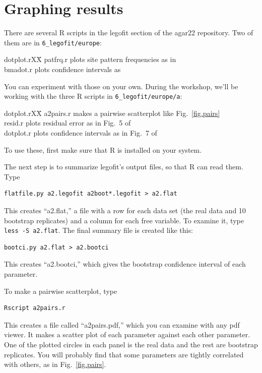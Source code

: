 \documentclass[11pt]{article}
\newenvironment{leftindent}%
{\begin{list}{}%
         {\setlength{\leftmargin}{2em}}%
         \item[]%
}{\end{list}}
\begin{document}
\section{Graphing results}
\label{sec.graph}
There are several R scripts in the legofit section of the agar22
repository. Two of them are in \verb|6_legofit/europe|:
\begin{leftindent}
\begin{tabbing}
  dotplot.rXX\=\kill
patfrq.r \> plots site pattern frequencies as in
    \citet[Fig.~3]{Rogers:arXiv-2201.02668}\\ 
bmadot.r \> plots confidence intervals as 
  \citet[Fig.~7]{Rogers:PCJ-2-e32}
\end{tabbing}
\end{leftindent}
You can experiment with those on your own. During the workshop, we'll
be working with the three R scripts in \verb|6_legofit/europe/a|:
\begin{leftindent}
\begin{tabbing}
  dotplot.rXX\=\kill
a2pairs.r \> makes a pairwise scatterplot like
  Fig.~\ref{fig.pairs}\\
resid.r \> plots residual error as in Fig.~5 of \citep{Rogers:PCJ-2-e32}\\
dotplot.r \> plots confidence intervals as in Fig.~7 of
  \citep{Rogers:PCJ-2-e32}
\end{tabbing}
\end{leftindent}
To use these, first make sure that R is installed on your system.

The next step is to summarize legofit's output files, so that R can
read them. Type
\begin{verbatim}
flatfile.py a2.legofit a2boot*.legofit > a2.flat
\end{verbatim}
This creates ``a2.flat,'' a file with a row for each data set (the
real data and 10 bootstrap replicates) and a column for each free
variable. To examine it, type \texttt{less -S a2.flat}. The final
summary file is created like this:
\begin{verbatim}
bootci.py a2.flat > a2.bootci
\end{verbatim}
This creates ``a2.bootci,'' which gives the bootstrap confidence
interval of each parameter.

To make a pairwise scatterplot, type
\begin{verbatim}
Rscript a2pairs.r
\end{verbatim}
This creates a file called ``a2pairs.pdf,'' which you can examine with
any pdf viewer. It makes a scatter plot of each parameter against each
other parameter. One of the plotted circles in each panel is the real
data and the rest are bootstrap replicates. You will probably find
that some parameters are tightly correlated with others, as in
Fig.~\ref{fig.pairs}.
\end{document}
